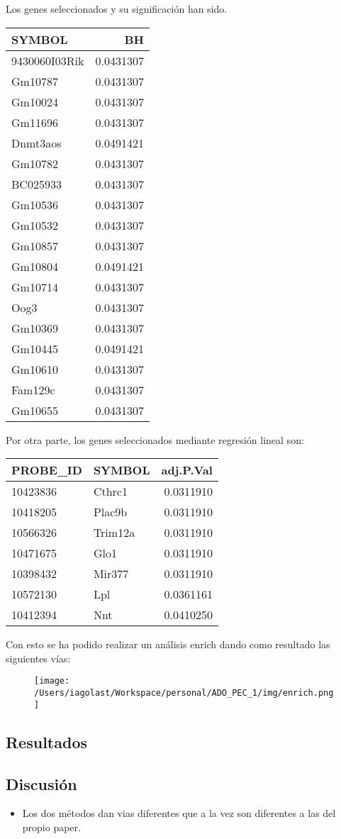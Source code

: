 \documentclass[
]{article}
\begin{document}
Los genes seleccionados y su significación han sido.

\begin{longtable}[]{@{}lr@{}}
\toprule
SYMBOL & BH\tabularnewline
\midrule
\endhead
9430060I03Rik & 0.0431307\tabularnewline
Gm10787 & 0.0431307\tabularnewline
Gm10024 & 0.0431307\tabularnewline
Gm11696 & 0.0431307\tabularnewline
Dnmt3aos & 0.0491421\tabularnewline
Gm10782 & 0.0431307\tabularnewline
BC025933 & 0.0431307\tabularnewline
Gm10536 & 0.0431307\tabularnewline
Gm10532 & 0.0431307\tabularnewline
Gm10857 & 0.0431307\tabularnewline
Gm10804 & 0.0491421\tabularnewline
Gm10714 & 0.0431307\tabularnewline
Oog3 & 0.0431307\tabularnewline
Gm10369 & 0.0431307\tabularnewline
Gm10445 & 0.0491421\tabularnewline
Gm10610 & 0.0431307\tabularnewline
Fam129c & 0.0431307\tabularnewline
Gm10655 & 0.0431307\tabularnewline
\bottomrule
\end{longtable}

Por otra parte, los genes seleccionados mediante regresión lineal son:

\begin{longtable}[]{@{}llr@{}}
\toprule
\textbf{PROBE\_ID} & SYMBOL & adj.P.Val\tabularnewline
\midrule
\endhead
10423836 & Cthrc1 & 0.0311910\tabularnewline
10418205 & Plac9b & 0.0311910\tabularnewline
10566326 & Trim12a & 0.0311910\tabularnewline
10471675 & Glo1 & 0.0311910\tabularnewline
10398432 & Mir377 & 0.0311910\tabularnewline
10572130 & Lpl & 0.0361161\tabularnewline
10412394 & Nnt & 0.0410250\tabularnewline
\bottomrule
\end{longtable}

Con esto se ha podido realizar un análisis enrich dando como resultado
las siguientes vías:

\begin{figure}
\centering
\texttt{[image: /Users/iagolast/Workspace/personal/ADO\_PEC\_1/img/enrich.png]}
\caption{}
\end{figure}

\hypertarget{header-n1363}{%
\subsection{Resultados}\label{header-n1363}}

\hypertarget{header-n1364}{%
\subsection{Discusión}\label{header-n1364}}

\begin{itemize}
\item
  Los dos métodos dan vias diferentes que a la vez son diferentes a las
  del propio paper.
\end{itemize}
\end{document}
